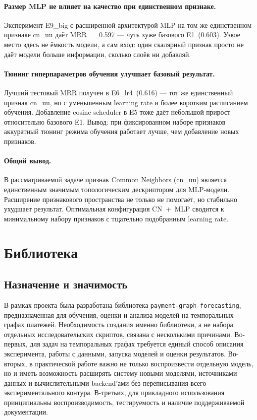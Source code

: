 \documentclass[a4paper,12pt]{extarticle}
\begin{document}
\paragraph{Размер MLP не влияет на качество при единственном признаке.}
Эксперимент E9\_big с расширенной архитектурой MLP на том же единственном признаке cn\_uu даёт MRR~=~0.597 --- чуть хуже базового E1~(0.603). Узкое место здесь не ёмкость модели, а сам вход: один скалярный признак просто не даёт модели больше информации, сколько слоёв ни добавляй.

\paragraph{Тюнинг гиперпараметров обучения улучшает базовый результат.}
Лучший тестовый MRR получен в E6\_lr4~(0.616) --- тот же единственный признак cn\_uu, но с уменьшенным learning rate и более коротким расписанием обучения. Добавление cosine scheduler в E5 тоже даёт небольшой прирост относительно базового E1. Вывод: при фиксированном наборе признаков аккуратный тюнинг режима обучения работает лучше, чем добавление новых признаков.

\paragraph{Общий вывод.}
В рассматриваемой задаче признак Common Neighbors (cn\_uu) является единственным значимым топологическим дескриптором для MLP-модели. Расширение признакового пространства не только не помогает, но стабильно ухудшает результат. Оптимальная конфигурация CN~+~MLP сводится к минимальному набору признаков с тщательно подобранным learning rate.

\newpage

\section{Библиотека}

\subsection{Назначение и значимость}

  В рамках проекта была разработана библиотека \texttt{payment-graph-forecasting}, предназначенная для обучения, оценки и анализа моделей на темпоральных графах
  платежей. Необходимость создания именно библиотеки, а не набора отдельных исследовательских скриптов, связана с несколькими причинами. Во-первых, для задач на
  темпоральных графах требуется единый способ описания эксперимента, работы с данными, запуска моделей и оценки результатов. Во-вторых, в практической работе важно
  не только воспроизвести отдельную модель, но и иметь возможность расширять систему новыми моделями, источниками данных и вычислительными backend'ами без
  переписывания всего экспериментального контура. В-третьих, для прикладного использования принципиальны воспроизводимость, тестируемость и наличие поддерживаемой
  документации.
\end{document}
